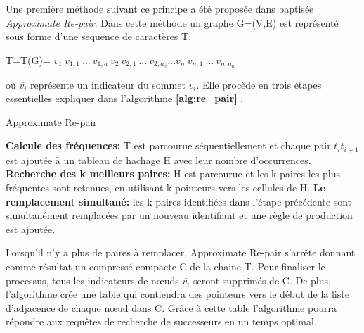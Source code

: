 		Une première méthode suivant ce principe a été proposée dans \citep{claude2010fast} baptisée \textit{Approximate Re-pair}. Dans cette méthode un graphe G=(V,E) est représenté sous forme d'une sequence de caractères T: \begin{center}
		T=T(G)= $\overline{v_{1}}\ v_{1,1}\ ...\ v_{1,a}\ \overline{v_{2}}\ v_{2,1}\ ...\ v_{2,a_{2}} ... \overline{v_{n}}\ v_{n,1}\ ...\ v_{n,a_{n}}\ $						
\end{center}	
où $\overline{v_{i}}$ représente un indicateur du sommet $v_{i}$. Elle procède en trois étapes essentielles expliquer dans l'algorithme \textbf{\ref{alg:re_pair}} .
	\begin{algorithm}
		\caption{Approximate Re-pair}
		\label{alg:re_pair}
		\begin{algorithmic}[1]
			\STATE \textbf{Calcule des fréquences:} T est parcourue séquentiellement et chaque pair $t_{i}t_{i+1}$ est ajoutée à un tableau de hachage H avec leur nombre d'occurrences. 
			\STATE \textbf{Recherche des k meilleurs paires:}  H est parcourue et les k paires les plus fréquentes sont retenues, en utilisant k pointeurs vers les cellules de H.
			\STATE \textbf{Le remplacement simultané:} les k paires identifiées dans l'étape précédente sont simultanément remplacées par un nouveau identifiant et une règle de production est ajoutée.
		\end{algorithmic}
	\end{algorithm}
	Lorsqu'il n'y a plus de paires à remplacer, Approximate Re-pair s'arrête donnant comme résultat un compressé compacte C de la chaine T. Pour finaliser le processus, tous les indicateurs de nœuds $\overline{v_{i}}$ seront supprimés de C. De plus, l'algorithme crée une table qui contiendra des pointeurs vers le début de la liste d'adjacence de chaque nœud dans C. Grâce à cette table l'algorithme pourra répondre aux requêtes de recherche de successeurs en un temps optimal.